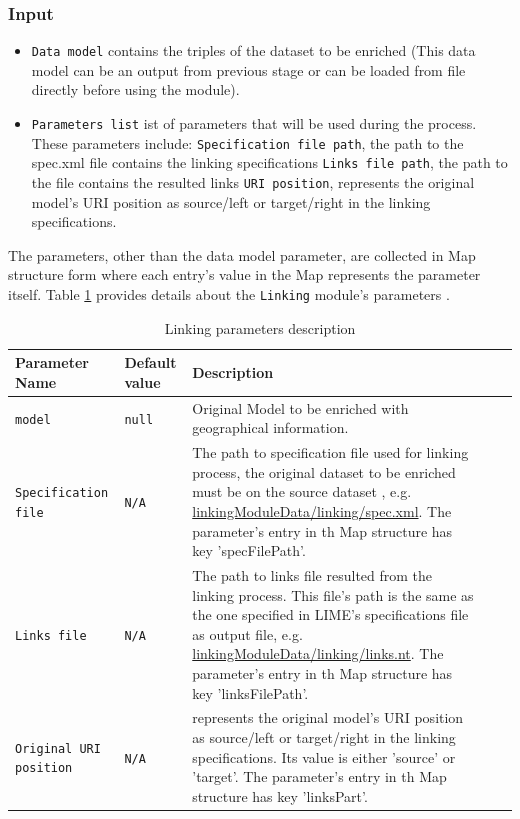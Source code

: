 \documentclass[a4paper,twoside,bibtotoc,abstracton,12pt,BCOR=15mm]{article}
\begin{document}
\subsubsection{Input}
\begin{itemize}
 \item \texttt{Data model} contains the triples of the dataset to be enriched (This data model can be an output from previous stage or can be loaded from file directly before using the module). 
 \item \texttt{Parameters list} ist of parameters that will be used during the process. These parameters include:
 \subitem \texttt{Specification file path}, the path to the spec.xml file contains the linking specifications
 \subitem \texttt{Links file path}, the path to the file contains the resulted links 
 \subitem \texttt{URI position}, represents the original model's URI position as source/left or target/right in the linking specifications.
\end{itemize}
The parameters, other than the data model parameter, are  collected in Map structure form where each entry's value in the Map represents the parameter itself.
Table \ref{tbl:linkingPram} provides details about the \texttt{Linking} module's parameters .
\begin{table}[ht]
\caption{Linking parameters description} \label{tbl:linkingPram}
\begin{tabular}{@{}  l  l p{7cm} l p{6cm}@{}}
\toprule
\textbf{Parameter Name} & \textbf{Default value} & \textbf{Description}\\
\midrule
\texttt{model}	& \texttt{null} 	& Original Model to be enriched with geographical information.\\
\texttt{Specification file} 	& \texttt{N/A} 	& The path to specification file used for linking process, the original dataset to be enriched must be on the source dataset , e.g. \url {linkingModuleData/linking/spec.xml}. The parameter's entry in th Map structure has key 'specFilePath'.\\
\texttt{Links file} 	& \texttt{N/A} 	& The path to links file resulted from the linking process. This file's path is the same as the one specified in LIME's specifications file as output file, e.g. \url {linkingModuleData/linking/links.nt}. The parameter's entry in th Map structure has key 'linksFilePath'.\\
\texttt{Original URI position} 	& \texttt{N/A} 	& represents the original model's URI position as source/left or target/right in the linking specifications. Its value is either 'source' or 'target'. The parameter's entry in th Map structure has key 'linksPart'.\\ 
\bottomrule
\end{tabular}
\end{table}
\end{document}
